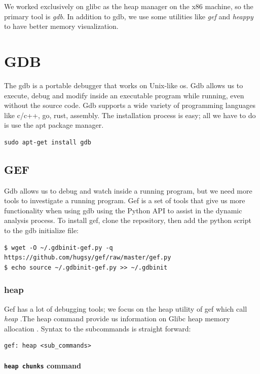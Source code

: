 \documentclass{masterthesis}
\newcommand*\libc{glibc}
\begin{document}
We worked exclusively on \libc{} as the heap manager on the x86 machine, so the primary tool is \emph{gdb}. In addition to gdb, we use some utilities like \emph{gef} and \emph{heappy} to have better memory visualization.


\section{GDB}
The gdb is a portable debugger that works on Unix-like os. Gdb allows us to execute, debug and modify inside an executable program while running, even without the source code. Gdb supports a wide variety of programming languages like c/c++, go, rust, assembly. The installation process is easy; all we have to do is use the apt package manager.
\begin{lstlisting}[frame=tlrb]
sudo apt-get install gdb
\end{lstlisting}

\subsection{GEF}
Gdb allows us to debug and watch inside a running program, but we need more tools to investigate a running program. Gef is a set of tools that give us more functionality when using gdb using the Python API to assist in the dynamic analysis process. To install gef, clone the repository, then add the python script to the gdb initialize file:
\begin{lstlisting}[frame=tlrb]
$ wget -O ~/.gdbinit-gef.py -q https://github.com/hugsy/gef/raw/master/gef.py
$ echo source ~/.gdbinit-gef.py >> ~/.gdbinit
\end{lstlisting}

\subsubsection{heap}
Gef has a lot of debugging tools; we focus on the heap utility of gef which call \emph{heap} .The heap command provide us information on Glibc heap memory allocation . Syntax to the subcommands is straight forward:
\begin{lstlisting}[frame=tlrb]
gef: heap <sub_commands>
\end{lstlisting}

\paragraph{\lstinline{heap chunks} command}
\end{document}
